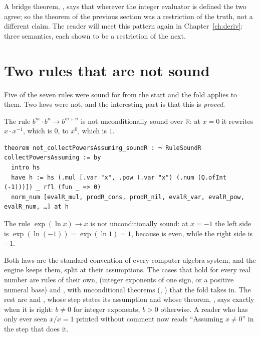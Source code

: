 A bridge theorem, , says that wherever the integer evaluator is defined the two
agree; so the theorem of the previous section was a restriction of the truth, not a different
claim. The reader will meet this pattern again in Chapter~\ref{ch:deriv}: three semantics, each
shown to be a restriction of the next.

\section{Two rules that are not sound}

Five of the seven rules were sound for  from the start and the fold applies to them. Two
laws were not, and the interesting part is that this is \emph{proved}.

\begin{thmbox}
  The rule $b^m \cdot b^n \to b^{m+n}$ is not unconditionally sound over $\mathbb{R}$: at $x = 0$
  it rewrites $x \cdot x^{-1}$, which is $0$, to $x^0$, which is $1$.
\end{thmbox}

\begin{verbatim}
theorem not_collectPowersAssuming_soundR : ¬ RuleSoundR collectPowersAssuming := by
  intro hs
  have h := hs (.mul [.var "x", .pow (.var "x") (.num (Q.ofInt (-1)))]) _ rfl (fun _ => 0)
  norm_num [evalR_mul, prodR_cons, prodR_nil, evalR_var, evalR_pow, evalR_num, …] at h
\end{verbatim}

\begin{thmbox}
  The rule $\exp(\ln x) \to x$ is not unconditionally sound: at $x = -1$ the left side is
  $\exp(\ln(-1)) = \exp(\ln 1) = 1$, because  is even, while the right side is $-1$.
\end{thmbox}

Both laws are the standard convention of every computer-algebra system, and the engine keeps
them, split at their assumptions. The cases that hold for every real number are rules of their own,
 (integer exponents of one sign, or a positive numeral base) and
, with unconditional theorems (, )
that the fold takes in. The rest are  and ,
whose step states its assumption and whose theorem, , says exactly
when it is right: $b \neq 0$ for integer exponents, $b > 0$ otherwise. A reader who has only ever
seen $x/x = 1$ printed without comment now reads ``Assuming $x \neq 0$'' in the step that does it.

